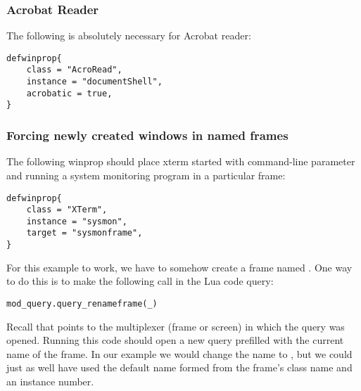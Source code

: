 \subsubsection{Acrobat Reader}

The following is absolutely necessary for Acrobat reader:

\begin{verbatim}
defwinprop{
    class = "AcroRead",
    instance = "documentShell",
    acrobatic = true,
}
\end{verbatim}

\subsubsection{Forcing newly created windows in named frames}

The following winprop should place xterm started with command-line parameter
\mbox{} and running a system monitoring program in a
particular frame:
\begin{verbatim}
defwinprop{
    class = "XTerm",
    instance = "sysmon",
    target = "sysmonframe",
}
\end{verbatim}

For this example to work, we have to somehow create a frame named
. One way to do this is to make the following
call in the  Lua code query:

\begin{verbatim}
mod_query.query_renameframe(_)
\end{verbatim}

Recall that \code{_} points to the multiplexer (frame or screen) in which 
the query was opened. Running this code should open a new query prefilled
with the current name of the frame. In our example we would change the 
name to , but we could just as well have used the 
default name formed from the frame's class name and an instance number.
